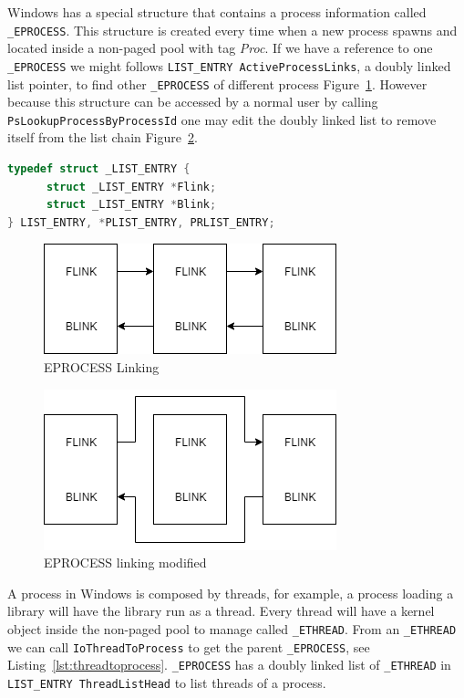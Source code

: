 Windows has a special structure that contains a process information called \texttt{\_EPROCESS}. This structure is created every time when a new process spawns and located inside a non-paged pool with tag \textit{Proc}. If we have a reference to one \texttt{\_EPROCESS} we might follows \texttt{LIST\_ENTRY ActiveProcessLinks}, a doubly linked list pointer, to find other \texttt{\_EPROCESS} of different process Figure~\ref{fig:eprocesslink}. However because this structure can be accessed by a normal user by calling \texttt{PsLookupProcessByProcessId} one may edit the doubly linked list to remove itself from the list chain Figure~\ref{fig:dkom}.

\begin{lstlisting}[language=c,caption={LIST\_ENTRY},label={lst:listentry}]
typedef struct _LIST_ENTRY {
      struct _LIST_ENTRY *Flink;
      struct _LIST_ENTRY *Blink;
} LIST_ENTRY, *PLIST_ENTRY, PRLIST_ENTRY;
\end{lstlisting}

\begin{figure}[H]
\centering
\caption{EPROCESS Linking}
\label{fig:eprocesslink}
\includegraphics[]{images/eprocess_link.png}
\end{figure}

\begin{figure}[H]
\centering
\caption{EPROCESS linking modified}
\label{fig:dkom}
\includegraphics[]{images/dkom.png}
\end{figure}

A process in Windows is composed by threads, for example, a process loading a library will have the library run as a thread. Every thread will have a kernel object inside the non-paged pool to manage called \texttt{\_ETHREAD}. From an \texttt{\_ETHREAD} we can call \texttt{IoThreadToProcess} to get the parent \texttt{\_EPROCESS}, see Listing~\ref{lst:threadtoprocess}. \texttt{\_EPROCESS} has a doubly linked list of \texttt{\_ETHREAD} in \texttt{LIST\_ENTRY ThreadListHead} to list threads of a process.

